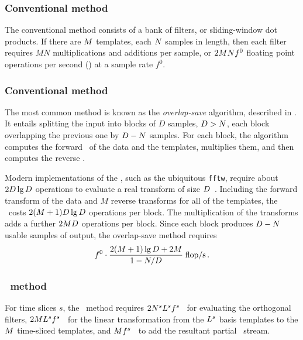\subsubsection{Conventional \TD{} method}

The conventional \TD{} method consists of a bank of \fir{} filters, or sliding-window dot products.  If there are $M$ templates, each $N$ samples in length, then each filter requires $M N$ multiplications and additions per sample, or $2 M N f^0$ floating point operations per second (\flops) at a sample rate $f^0$.

\subsubsection{Conventional \FD{} method}

The most common \FD{} method is known as the \emph{overlap-save} algorithm, described in \cite{numerical-recipes-chapter-13}.  It entails splitting the input into blocks of $D$ samples, $D > N$, each block overlapping the previous one by $D - N$ samples.  For each block, the algorithm computes the forward \fft\ of the data and the templates, multiplies them, and then computes the reverse \fft.

Modern implementations of the \fft, such as the ubiquitous \texttt{fftw}, require about $2 D \lg D$ operations to evaluate a real transform of size $D$~\cite{Johnson:2007p9654}.  Including the forward transform of the data and $M$ reverse transforms for all of the templates, the \fft\ costs $2 (M + 1) D \lg D$ operations per block.  The multiplication of the transforms adds a further $2 M D$ operations per block.  Since each block produces $D - N$ usable samples of output, the overlap-save method requires
$$
f^0 \cdot \frac{2 (M + 1) \lg D + 2 M}{1 - N/D} \; \mathrm{flop/s} \,.
$$

\subsubsection{\lloid\ method}

For time slices $s$, the \lloid\ method requires $2 N^s L^s f^s$ \flops\ 
for evaluating the orthogonal filters, $2 M L^s f^s$ \flops\ for the 
linear transformation from the $L^s$ basis templates to the $M$ time-sliced templates, and $M f^s$ \flops\ to add the resultant partial \SNR\ stream.

